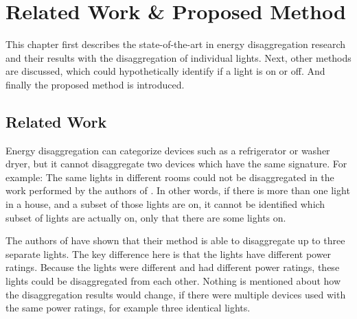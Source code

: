 
\chapter{Related Work \& Proposed Method}
\label{chp:related-work}


















This chapter first describes the state-of-the-art in energy disaggregation research and their results with the disaggregation of individual lights.
Next, other methods are discussed, which could hypothetically identify if a light is on or off.
And finally the proposed method is introduced.


	\section{Related Work}

		Energy disaggregation can categorize devices such as a refrigerator or washer dryer, but it cannot disaggregate two devices which have the same signature.
		For example: The same lights in different rooms could not be disaggregated in the work performed by the authors of \cite{froehlich2011disaggregated}.
		In other words, if there is more than one light in a house, and a subset of those lights are on, it cannot be identified which subset of lights are actually on, only that there are some lights on.


		The authors of \cite{shao2013temporal} have shown that their method is able to disaggregate up to three separate lights.
		The key difference here is that the lights have different power ratings.
		Because the lights were different and had different power ratings, these lights could be disaggregated from each other.
		Nothing is mentioned about how the disaggregation results would change, if there were multiple devices used with the same power ratings, for example three identical lights.


